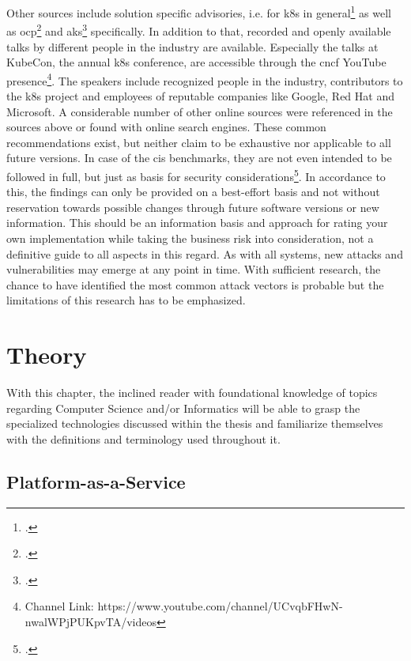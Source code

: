 Other sources include solution specific advisories, i.e. for \gls{k8s} in general\footcite{k8sDocsSecurity} as well as \gls{ocp}\footcite{ocpSecTips} and \gls{aks}\footcite{aksSecTips} specifically. In addition to that, recorded and openly available talks by different people in the industry are available. Especially the talks at KubeCon, the annual \gls{k8s} conference, are accessible through the \gls{cncf} YouTube presence\footnote{Channel Link: https://www.youtube.com/channel/UCvqbFHwN-nwalWPjPUKpvTA/videos}. The speakers include recognized people in the industry, contributors to the \gls{k8s} project and employees of reputable companies like Google, Red Hat and Microsoft.
A considerable number of other online sources were referenced in the sources above or found with online search engines.
These common recommendations exist, but neither claim to be exhaustive nor applicable to all future versions. In case of the \gls{cis} benchmarks, they are not even intended to be followed in full, but just as basis for security considerations\footcite[][, starting at 29:18]{cisJustRecommendation}.
In accordance to this, the findings can only be provided on a best-effort basis and not without reservation towards possible changes through future software versions or new information. This should be an information basis and approach for rating your own implementation while taking the business risk into consideration, not a definitive guide to all aspects in this regard.
As with all systems, new attacks and vulnerabilities may emerge at any point in time. With sufficient research, the chance to have identified the most common attack vectors is probable but the limitations of this research has to be emphasized.

\chapter{Theory}
With this chapter, the inclined reader with foundational knowledge of topics regarding Computer Science and/or Informatics 
will be able to grasp the specialized technologies discussed within the thesis and familiarize themselves with the definitions and terminology used throughout it.

\section{Platform-as-a-Service}

